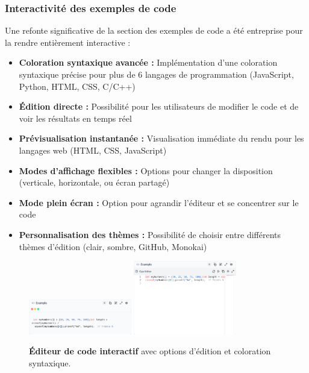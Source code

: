 \subsubsection{Interactivité des exemples de code}

Une refonte significative de la section des exemples de code a été entreprise pour la rendre entièrement interactive :
\begin{itemize}
    \item \textbf{Coloration syntaxique avancée :} Implémentation d'une coloration syntaxique précise pour plus de 6 langages de programmation (JavaScript, Python, HTML, CSS, C/C++)
    \item \textbf{Édition directe :} Possibilité pour les utilisateurs de modifier le code et de voir les résultats en temps réel
    \item \textbf{Prévisualisation instantanée :} Visualisation immédiate du rendu pour les langages web (HTML, CSS, JavaScript)
    \item \textbf{Modes d'affichage flexibles :} Options pour changer la disposition (verticale, horizontale, ou écran partagé)
    \item \textbf{Mode plein écran :} Option pour agrandir l'éditeur et se concentrer sur le code
    \item \textbf{Personnalisation des thèmes :} Possibilité de choisir entre différents thèmes d'édition (clair, sombre, GitHub, Monokai)
\end{itemize}

\begin{figure}[H]
  \centering
  \includegraphics[width=0.4\textwidth,keepaspectratio]{old-reports/week_4_img/pre_edit.jpeg}
  \includegraphics[width=0.4\textwidth,keepaspectratio]{old-reports/week_4_img/editmode.jpeg}
  \caption{\textbf{Éditeur de code interactif} avec options d'édition et coloration syntaxique.}
  \label{fig:code_editor}
\end{figure}

